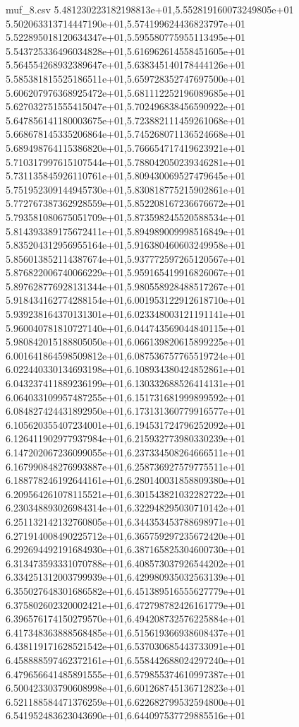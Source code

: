 \begin{filecontents*}{muf_8.csv}
5.481230223182198813e+01,5.552819160073249805e+01
5.502063313714447190e+01,5.574199624436823797e+01
5.522895018120634347e+01,5.595580775955113495e+01
5.543725336496034828e+01,5.616962614558451605e+01
5.564554268932389647e+01,5.638345140178444126e+01
5.585381815525186511e+01,5.659728352747697500e+01
5.606207976368925472e+01,5.681112252196089685e+01
5.627032751555415047e+01,5.702496838456590922e+01
5.647856141180003675e+01,5.723882111459261068e+01
5.668678145335206864e+01,5.745268071136524668e+01
5.689498764115386820e+01,5.766654717419623921e+01
5.710317997615107544e+01,5.788042050239346281e+01
5.731135845926110761e+01,5.809430069527479645e+01
5.751952309144945730e+01,5.830818775215902861e+01
5.772767387362928559e+01,5.852208167236676672e+01
5.793581080675051709e+01,5.873598245520588534e+01
5.814393389175672411e+01,5.894989009998516849e+01
5.835204312956955164e+01,5.916380460603249958e+01
5.856013852114387674e+01,5.937772597265120567e+01
5.876822006740066229e+01,5.959165419916826067e+01
5.897628776928131344e+01,5.980558928488517267e+01
5.918434162774288154e+01,6.001953122912618710e+01
5.939238164370131301e+01,6.023348003121191141e+01
5.960040781810727140e+01,6.044743569044840115e+01
5.980842015188805050e+01,6.066139820615899225e+01
6.001641864598509812e+01,6.087536757765519724e+01
6.022440330134693198e+01,6.108934380424852861e+01
6.043237411889236199e+01,6.130332688526414131e+01
6.064033109957487255e+01,6.151731681999899592e+01
6.084827424431892950e+01,6.173131360779916577e+01
6.105620355407234001e+01,6.194531724796252092e+01
6.126411902977937984e+01,6.215932773980330239e+01
6.147202067236099055e+01,6.237334508264666511e+01
6.167990848276993887e+01,6.258736927579775511e+01
6.188778246192644161e+01,6.280140031858809380e+01
6.209564261078115521e+01,6.301543821032282722e+01
6.230348893026984314e+01,6.322948295030710142e+01
6.251132142132760805e+01,6.344353453788698971e+01
6.271914008490225712e+01,6.365759297235672420e+01
6.292694492191684930e+01,6.387165825304600730e+01
6.313473593331070788e+01,6.408573037926544202e+01
6.334251312003799939e+01,6.429980935032563139e+01
6.355027648301686582e+01,6.451389516555627779e+01
6.375802602320002421e+01,6.472798782426161779e+01
6.396576174150279570e+01,6.494208732576225884e+01
6.417348363888568485e+01,6.515619366938608437e+01
6.438119171628521542e+01,6.537030685443733091e+01
6.458888597462372161e+01,6.558442688024297240e+01
6.479656641485891555e+01,6.579855374610997387e+01
6.500423303790608998e+01,6.601268745136712823e+01
6.521188584471376259e+01,6.622682799532594800e+01
6.541952483623043690e+01,6.644097537729885516e+01

\end{filecontents*}

